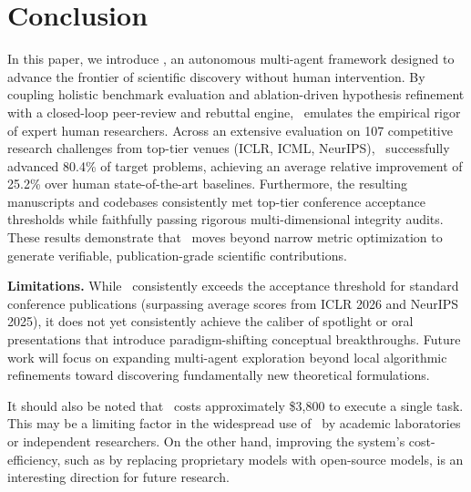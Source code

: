 \section{Conclusion}\label{sec:conclusion}

In this paper, we introduce \sname, an autonomous multi-agent framework designed to advance the frontier of scientific discovery without human intervention. By coupling holistic benchmark evaluation and ablation-driven hypothesis refinement with a closed-loop peer-review and rebuttal engine, \sname~emulates the empirical rigor of expert human researchers. Across an extensive evaluation on 107 competitive research challenges from top-tier venues (ICLR, ICML, NeurIPS), \sname~successfully advanced 80.4\% of target problems, achieving an average relative improvement of 25.2\% over human state-of-the-art baselines. Furthermore, the resulting manuscripts and codebases consistently met top-tier conference acceptance thresholds while faithfully passing rigorous multi-dimensional integrity audits. These results demonstrate that \sname~moves beyond narrow metric optimization to generate verifiable, publication-grade scientific contributions.

\noindent\textbf{Limitations.} While \sname~consistently exceeds the acceptance threshold for standard conference publications (surpassing average scores from ICLR 2026 and NeurIPS 2025), it does not yet consistently achieve the caliber of spotlight or oral presentations that introduce paradigm-shifting conceptual breakthroughs. Future work will focus on expanding multi-agent exploration beyond local algorithmic refinements toward discovering fundamentally new theoretical formulations.

It should also be noted that \sname~costs approximately \$3,800 to execute a single task. This may be a limiting factor in the widespread use of \sname~by academic laboratories or independent researchers. On the other hand, improving the system's cost-efficiency, such as by replacing proprietary models with open-source models, is an interesting direction for future research.